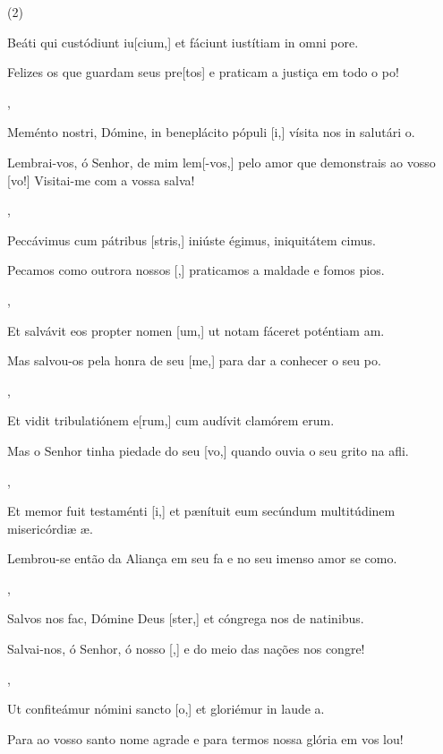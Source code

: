 \SetVersePairs(2){
  {\item {}Beáti qui custódiunt iu[cium,] et fáciunt iustítiam in omni pore.~\Responsorium}%
    {\item {}Felizes os que guardam seus pre[tos] e praticam a justiça em todo o po!~\Responsorium},
  {\item {}Meménto nostri, Dómine, in beneplácito pópuli [i,] vísita nos in salutári o.~\Responsorium}%
    {\item {}Lembrai-vos, ó Senhor, de mim lem[-vos,] pelo amor que demonstrais ao vosso [vo!] Visitai-me com a vossa salva!~\Responsorium},
  {\item {}Peccávimus cum pátribus [stris,] iniúste égimus, iniquitátem cimus.~\Responsorium}%
    {\item {}Pecamos como outrora nossos [,] praticamos a maldade e fomos pios.~\Responsorium},
  {\item {}Et salvávit eos propter nomen [um,] ut notam fáceret poténtiam am.~\Responsorium}%
    {\item {}Mas salvou-os pela honra de seu [me,] para dar a conhecer o seu po.~\Responsorium},
  {\item {}Et vidit tribulatiónem e[rum,] cum audívit clamórem erum.~\Responsorium}%
    {\item {}Mas o Senhor tinha piedade do seu [vo,] quando ouvia o seu grito na afli.~\Responsorium},
  {\item {}Et memor fuit testaménti [i,] et pænítuit eum secúndum multitúdinem misericórdiæ æ.~\Responsorium}%
    {\item {}Lembrou-se então da Aliança em seu fa e no seu imenso amor se como.~\Responsorium},
  {\item {}Salvos nos fac, Dómine Deus [ster,] et cóngrega nos de natinibus.~\Responsorium}%
    {\item {}Salvai-nos, ó Senhor, ó nosso [,] e do meio das nações nos congre!~\Responsorium},
  {\item {}Ut confiteámur nómini sancto [o,] et gloriémur in laude a.~\Responsorium}%
    {\item {}Para ao vosso santo nome agrade e para termos nossa glória em vos lou!~\Responsorium}
}